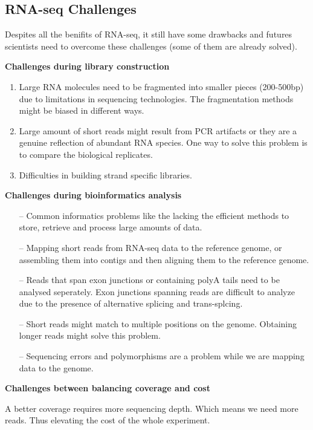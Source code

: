 \documentclass[a4paper,12pt]{article}
\begin{document}
\subsection{RNA-seq Challenges}
Despites all the benifits of RNA-seq, it still have some drawbacks and futures scientists need to overcome these challenges (some of them are already solved).

\vspace{5mm}
\textbf{Challenges during library construction}
\begin{enumerate}
	\item Large RNA molecules need to be fragmented into smaller pieces (200-500bp) due to limitations in sequencing technologies. The fragmentation methods might be biased in different ways.
	\item Large amount of short reads might result from PCR artifacts or they are a genuine reflection of abundant RNA species. One way to solve this problem is to compare the biological replicates. 
	\item Difficulties in building strand specific libraries.
\end{enumerate}

\textbf{Challenges during bioinformatics analysis}
\begin{itemize}
	\item [--]Common informatics problems like the lacking the efficient methods to store, retrieve and process large amounts of data.
	\item [--]Mapping short reads from RNA-seq data to the reference genome, or assembling them into contigs and then aligning them to the reference genome.
	\item [--]Reads that span exon junctions or containing polyA tails need to be analysed seperately. Exon junctions spanning reads are difficult to analyze due to the presence of alternative splicing and trans-splcing.
	\item [--]Short reads might match to multiple positions on the genome. Obtaining longer reads might solve this problem.
	\item [--]Sequencing errors and polymorphisms are a problem while we are mapping data to the genome.
\end{itemize}

\textbf{Challenges between balancing coverage and cost}

A better coverage requires more sequencing depth. Which means we need more reads. Thus elevating the cost of the whole experiment.
\end{document}
